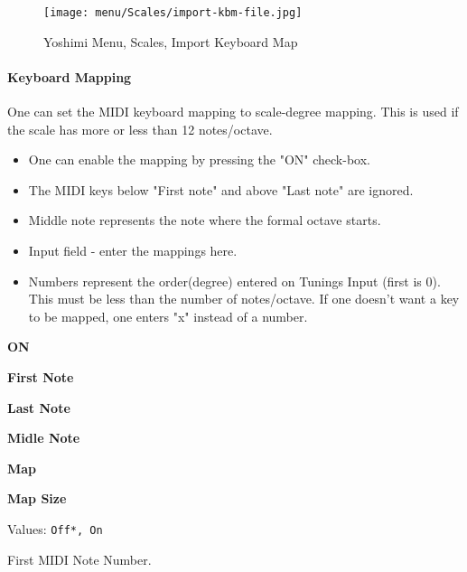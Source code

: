 \begin{figure}[H]
   \centering 
   \texttt{[image: menu/Scales/import-kbm-file.jpg]}
   \caption{Yoshimi Menu, Scales, Import Keyboard Map}
   \label{fig:yoshimi_menu_scales_import_keyboard_map}
\end{figure}


\paragraph{Keyboard Mapping}
\label{paragraph:menu_scales_keyboard_mapping}

   One can set the MIDI keyboard mapping to scale-degree mapping.
   This is used if the scale has more or less than 12 notes/octave.

   \begin{itemize}
      \item One can enable the mapping by pressing the "ON" check-box.
      \item The MIDI keys below "First note" and above "Last note" are ignored.
      \item Middle note represents the note where the formal octave starts.
      \item Input field - enter the mappings here.
      \item Numbers represent the order(degree) entered on Tunings Input
         (first is 0). This must be less than the number of notes/octave. If
         one doesn't want a key to be mapped, one enters "x" instead of a
         number.
   \end{itemize}

   \begin{enumber}
      \item \textbf{ON}
      \item \textbf{First Note}
      \item \textbf{Last Note}
      \item \textbf{Midle Note}
      \item \textbf{Map}
      \item \textbf{Map Size}
   \end{enumber}

   \setcounter{ItemCounter}{0}      %


   Values: \texttt{Off*, On}

   First MIDI Note Number.

